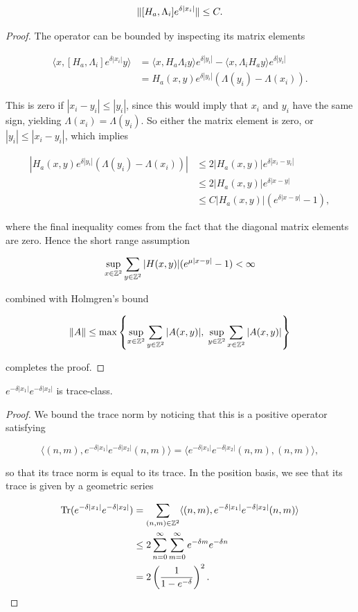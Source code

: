 \documentclass[12pt, letterpaper]{article}
\begin{document}
\begin{lemma}
\[\lVert [H_a, \Lambda_i]e^{\delta|x_i|} \rVert \leq C.\]
\label{lemma:keybound}
\end{lemma}
\begin{proof} 
The operator can be bounded by inspecting its matrix elements

\[\begin{aligned}
\langle x, [H_a,\Lambda_i]e^{\delta|x_i|} y\rangle &= \langle x, H_a\Lambda_i y\rangle e^{\delta |y_i|} - \langle x, \Lambda_i H_a y\rangle e^{\delta|y_i|}  \\
&= H_a(x,y)e^{\delta|y_i|}(\Lambda(y_i)-\Lambda(x_i)).
\end{aligned}\]

This is zero if $|x_i-y_i|\leq |y_i|$, since this would imply that $x_i$ and $y_i$ have the same sign, yielding $\Lambda(x_i)=\Lambda(y_i)$. So either the matrix element is zero, or $|y_i|\leq|x_i-y_i|$, which implies

\[\begin{aligned}
|H_a(x,y)e^{\delta|y_i|}(\Lambda(y_i)-\Lambda(x_i))| &\leq 2|H_a(x,y)|e^{\delta|x_i-y_i|}\\
&\leq 2|H_a(x,y)|e^{\delta|x-y|}\\
&\leq C|H_a(x,y)|(e^{\delta|x-y|}-1),
\end{aligned}\]

where the final inequality comes from the fact that the diagonal matrix elements are zero. Hence the short range assumption

\[\sup_{x\in\mathbb{Z}^2}\sum_{y\in\mathbb{Z}^2}|H(x,y)|(e^{\mu|x-y|}-1)<\infty\]

combined with Holmgren's bound

\[\lVert A \rVert \leq \max \left\{ \sup_{x\in\mathbb{Z}^2} \sum_{y\in\mathbb{Z}^2} |A(x,y)|, \; \sup_{y\in\mathbb{Z}^2}\sum_{x\in\mathbb{Z}^2}|A(x,y)| \right\}\]

completes the proof.
\end{proof}




\begin{lemma}
$e^{-\delta|x_1|}e^{-\delta|x_2|}$ is trace-class.
\label{lemma:exptraceclass}
\end{lemma}
\begin{proof}
We bound the trace norm by noticing that this is a positive operator satisfying 

\[\langle (n,m), e^{-\delta|x_1|}e^{-\delta|x_2|} (n,m) \rangle = \langle e^{-\delta|x_1|}e^{-\delta|x_2|}(n,m), (n,m) \rangle,\]

so that its trace norm is equal to its trace. In the position basis, we see that its trace is given by a geometric series

\[\begin{aligned}
\text{Tr}(e^{-\delta|x_1|}e^{-\delta|x_2|}) &= \sum_{(n,m)\in\mathbb{Z}^2} \langle (n,m), e^{-\delta|x_1|}e^{-\delta|x_2|} (n,m) \rangle \\
&\leq 2 \sum_{n=0}^\infty \sum_{m=0}^\infty e^{-\delta m}e^{-\delta n} \\
&= 2\left(\frac{1}{1-e^{-\delta}}\right)^2.
\end{aligned}\]

\end{proof}
\end{document}
